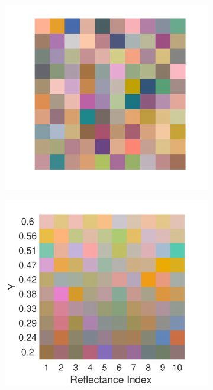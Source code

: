 \documentclass{jov}
\begin{document}
\begin{figure}
\begin{subfigure}{0.24 \textwidth}
        \label{fig:xyChroReflectance}
    \end{subfigure}
    \begin{subfigure}{0.24 \textwidth}
    \centering
    \caption{}
        \includegraphics[width=\textwidth]{../Figures/Figure7/Figure7_c.pdf}
        \label{fig:backgroundSwatches}
    \end{subfigure}    
    \centering
	\begin{subfigure}{0.24 \textwidth}
    \centering
        \caption{}
        \includegraphics[width=\textwidth]{../Figures/Figure7/Figure8.pdf}

\end{subfigure}
\end{figure}
\end{document}
